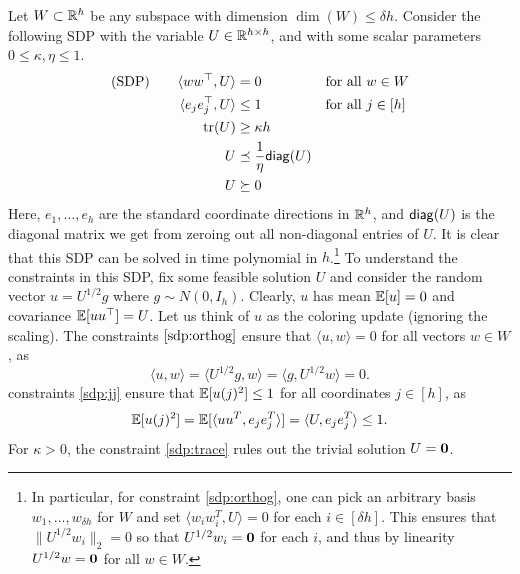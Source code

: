  Let $W \subset \mathbb{R}^h$ be any subspace with dimension $\dim(W) \le \delta h$. 
Consider the following SDP with the variable $U \in \mathbb{R}^{h\times h}$, and  with some scalar parameters $0\leq \kappa, \eta \leq 1$.
\begin{align}
 \text{(SDP)} \qquad   \langle ww^\top, U \rangle           &= 0                                          && \text{for all } w \in W  \label{sdp:orthog}\\
    \langle e_je_j^\top, U \rangle                               &\leq 1                                         && \text{for all } j \in [h] \label{sdp:jj} \\
    \operatorname{tr}(U)                                &\geq \kappa h                       \label{sdp:trace}         \\
    U                                     &\preceq \frac{1}{\eta} \mathsf{diag}(U)              \label{sdp:isotropic}\\
    U                                     &\succeq 0 \label{sdp:psd}
\end{align}
Here, $e_1,\ldots,e_h$ are the standard coordinate directions in $\mathbb{R}^h$, and $\mathsf{diag}(U)$ is the diagonal matrix we get from zeroing out all non-diagonal entries of $U$.
It is clear that this SDP can be solved in time polynomial in $h$.\footnote{In particular, for constraint \eqref{sdp:orthog}, one can pick an arbitrary basis $w_1,\ldots,w_{\delta h}$ for $W$ and set $\langle w_i w_i^T,U\rangle =0$ for each $i \in [\delta h]$. This ensures that $\|U^{1/2}w_i\|_2=0$ so that $U^{1/2}w_i ={\bf 0}$ for each $i$, and thus by linearity $U^{1/2}w =\bf{0}$ for all $w\in W$.}
To understand the constraints in this SDP, fix some feasible solution $U$ and consider the random vector $u =U^{1/2} g$ where $g \sim N(0,I_h)$. Clearly, $u$ has mean $\mathbb{E}[u]=0$ and covariance $\mathbb{E}[uu^\top]=U$. Let us think of $u$ as the coloring update  (ignoring the scaling). 
The constraints $\eqref{sdp:orthog}$ ensure that $\langle u,w\rangle=0 $ for all vectors $w\in W$, as  
\[\langle u,w\rangle = \langle U^{1/2} g,w \rangle = \langle g,U^{1/2} w \rangle  =0.\] 
constraints \eqref{sdp:jj} ensure that $\mathbb{E}[u(j)^2]\leq 1$ for all coordinates $j \in [h]$, as \[\mathbb{E}[u(j)^2] = \mathbb{E}[ \langle uu^T, e_je_j^T  \rangle] =  \langle U, e_je_j^T\rangle  \leq 1.\] 
For $\kappa >0$, the constraint \eqref{sdp:trace} rules out the trivial solution $U={\bf 0}$.

